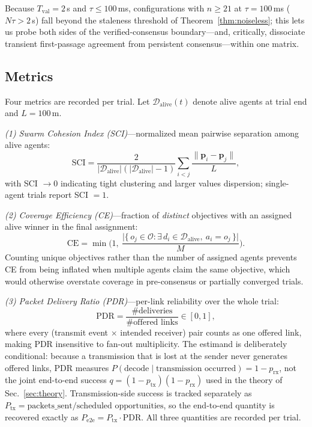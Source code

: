 Because $T_{\mathrm{val}} = 2$\,s and $\tau \leq 100$\,ms, configurations with $n \geq 21$ at $\tau = 100$\,ms ($N\tau > 2$\,s) fall beyond the staleness threshold of Theorem~\ref{thm:noiseless}; this lets us probe both sides of the verified-consensus boundary---and, critically, dissociate transient first-passage agreement from persistent consensus---within one matrix.

\subsection{Metrics}\label{sec:metrics}
Four metrics are recorded per trial. Let $\mathcal{D}_{\mathrm{alive}}(t)$ denote alive agents at trial end and $L = 100$\,m.

\emph{(1) Swarm Cohesion Index (SCI)}---normalized mean pairwise separation among alive agents:
\begin{equation}
    \mathrm{SCI} = \frac{2}{|\mathcal{D}_{\mathrm{alive}}|(|\mathcal{D}_{\mathrm{alive}}| - 1)}
    \sum_{i < j} \frac{\lVert \mathbf{p}_i - \mathbf{p}_j \rVert}{L},
    \label{eq:sci}
\end{equation}
with SCI $\to 0$ indicating tight clustering and larger values dispersion; single-agent trials report SCI $= 1$.

\emph{(2) Coverage Efficiency (CE)}---fraction of \emph{distinct} objectives with an assigned alive winner in the final assignment:
\begin{equation}
    \mathrm{CE} = \min\!\Big(1,\ \frac{\big|\{\, o_j \in \mathcal{O} : \exists\, d_i \in \mathcal{D}_{\mathrm{alive}},\ a_i = o_j \,\}\big|}{M}\Big).
    \label{eq:ce}
\end{equation}
Counting unique objectives rather than the number of assigned agents prevents CE from being inflated when multiple agents claim the same objective, which would otherwise overstate coverage in pre-consensus or partially converged trials.

\emph{(3) Packet Delivery Ratio (PDR)}---per-link reliability over the whole trial:
\begin{equation}
    \mathrm{PDR} = \frac{\#\text{deliveries}}{\#\text{offered links}} \in [0, 1],
    \label{eq:pdr}
\end{equation}
where every (transmit event $\times$ intended receiver) pair counts as one offered link, making PDR insensitive to fan-out multiplicity.
The estimand is deliberately conditional: because a transmission that is lost at the sender never generates offered links, PDR measures $P(\text{decode} \mid \text{transmission occurred}) = 1 - p_{\mathrm{rx}}$, not the joint end-to-end success $q = (1-p_{\mathrm{tx}})(1-p_{\mathrm{rx}})$ used in the theory of Sec.~\ref{sec:theory}. Transmission-side success is tracked separately as $P_{\mathrm{tx}} = \text{packets\_sent} / \text{scheduled opportunities}$, so the end-to-end quantity is recovered exactly as $P_{\mathrm{e2e}} = P_{\mathrm{tx}} \cdot \mathrm{PDR}$. All three quantities are recorded per trial.

